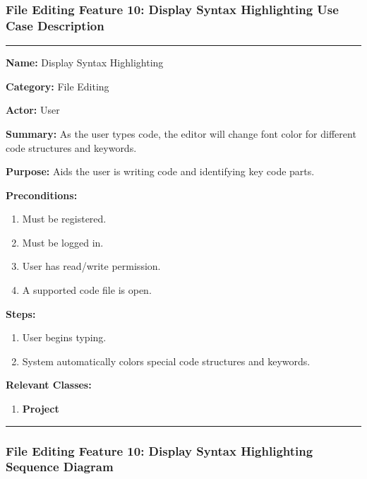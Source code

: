 \documentclass[twoside,letterpaper]{article}
\begin{document}
\newpage

\subsubsection[File Editing Feature 10: Display Syntax Highlighting]{\rmfamily\bfseries\color{black}
	File Editing Feature 10: Display Syntax Highlighting Use Case Description}
\hypertarget{RefHeading22059017292}{}

\vspace{2pt}
\hrule
\vspace{8pt}
	\noindent\textbf{Name:} Display Syntax Highlighting \newline
	
	\noindent\textbf{Category:} File Editing \newline
	
	\noindent\textbf{Actor:} User \newline
	
	\noindent\textbf{Summary:} As the user types code, the editor will change font color for different code structures and keywords. \newline
	
	\noindent\textbf{Purpose:} Aids the user is writing code and identifying key code parts. \newline
	
	\noindent\textbf{Preconditions:}
	\begin{enumerate}
		\item Must be registered.
		\item Must be logged in.
		\item User has read/write permission.
		\item A supported code file is open.
	\end{enumerate}
	\noindent\textbf{Steps:}
	\begin{enumerate}
		\item User begins typing.
		\item System automatically colors special code structures and keywords.
	\end{enumerate}
	\noindent\textbf{Relevant Classes:}
	\begin{enumerate}
	    \item \textbf {Project}
	\end{enumerate}
\vspace{8pt}
\hrule
\newpage

\subsubsection[File Editing Feature 10: Display Syntax Highlighting Sequence Diagram]{\rmfamily\bfseries\color{black}
	File Editing Feature 10: Display Syntax Highlighting Sequence Diagram}
\hypertarget{RefHeading22059017292}{}
\end{document}
